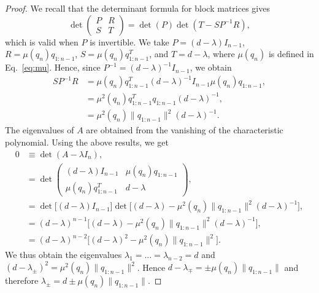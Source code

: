 \documentclass{rendiconti}
\begin{document}
\begin{proof}
We recall that the determinant formula for block matrices \cite{Zhang2005} gives
\begin{equation}
\det
\begin{pmatrix}
P & R \\
S & T
\end{pmatrix}
=
\det\left(P\right)\det\left(T-SP^{-1}R\right),
\end{equation}
which is valid when $P$ is invertible. We take
$P=(d-\lambda)I_{n-1}$,
$R=\mu(q_n) q_{1:n-1}$,
$S=\mu(q_n) q_{1:n-1}^T$, and $T=d-\lambda$, where $\mu(q_n)$ is defined in Eq.~\eqref{eq:mu}.
Hence, since $P^{-1}=(d-\lambda)^{-1}I_{n-1}$, we obtain
\begin{equation}
\textstyle
\begin{aligned}
SP^{-1}R
&=\mu(q_n) q_{1:n-1}^T(d-\lambda)^{-1}I_{n-1}\mu(q_n)q_{1:n-1},\\
&=\mu^2(q_n) q_{1:n-1}^T q_{1:n-1}(d-\lambda)^{-1},\\
&=\mu^2(q_n)\|q_{1:n-1}\|^2(d-\lambda)^{-1}.
\end{aligned}
\end{equation}
The eigenvalues of $A$ are obtained from the vanishing of the characteristic polynomial. Using the above results, we get
\begin{equation}
\textstyle
\begin{aligned}
0
&\equiv\det(A-\lambda I_n),\\
&=\det \begin{pmatrix}
(d-\lambda)I_{n-1} & \mu(q_n) q_{1:n-1}\\
\mu(q_n) q_{1:n-1}^T & d-\lambda
\end{pmatrix},\\
&=\det\Big[(d-\lambda)I_{n-1}\Big]
\det\Big[(d-\lambda)-\mu^2(q_n)\|q_{1:n-1}\|^2(d-\lambda)^{-1}\Big],\\
&=(d-\lambda)^{n-1}
\Big[(d-\lambda)-\mu^2(q_n)\|q_{1:n-1}\|^2(d-\lambda)^{-1}\Big],\\
&=(d-\lambda)^{n-2}
\Big[(d-\lambda)^2-\mu^2(q_n)\|q_{1:n-1}\|^2\Big].
\end{aligned}
\end{equation}
We thus obtain the eigenvalues $\lambda_1=\dots=\lambda_{n-2}=d$
and $(d-\lambda_\pm)^2=\mu^2(q_n)\|q_{1:n-1}\|^2$.
Hence
$d-\lambda_\mp=\pm\mu(q_n)\|q_{1:n-1}\|$
and therefore
$\lambda_\pm=d\pm\mu(q_n)\|q_{1:n-1}\|$.


\end{proof}
\end{document}
